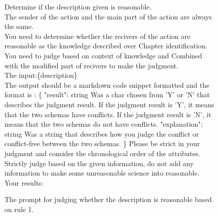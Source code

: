 \begin{figure}[htbp]
\centering
\begin{tcolorbox}
Determine if the description given is reasonable.
\\
The sender of the action and the main part of the action are always the same.\\
You need to determine whether the recivers of the action are reasonable as the knowledge described over Chapter identification.\\
You need to judge based on context of knowledge and Combined with the modified part of recivers to make the judgment.\\
The input:\{description\}\\
The output should be a markdown code snippet formatted and the format is : 
\{
        "result": string  Was a char chosen from 'Y' or 'N' that describes the judgment result. If the judgment result is 'Y', it means that the two schemas have conflicts. If the judgment result is 'N', it means that the two schemas do not have conflicts.
        "explanation": string Was a string that describes how you judge the conflict or conflict-free between the two schemas.
\}
Please be strict in your judgment and consider the chronological order of the attributes.\\
Strictly judge based on the given information, do not add any information to make some unreasonable science into reasonable.\\
Your results:\\
\end{tcolorbox}
\caption{The prompt for judging whether the description is reasonable based on rule 1.}
\label{tab:judge1}
\end{figure}




